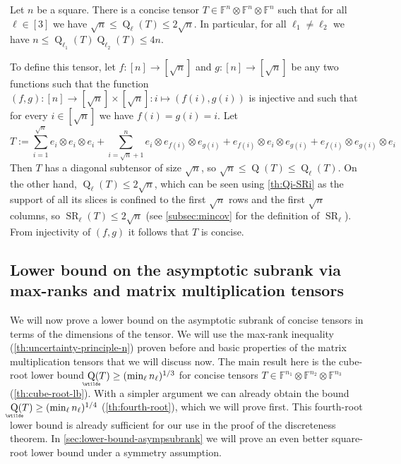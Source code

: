 \documentclass{daj}
\DeclareMathOperator{\subrank}{Q}
\DeclareMathOperator{\slicerank}{SR}
\DeclareMathOperator{\asympsubrank}{\underaccent{\wtilde}{Q}}
\newcommand{\FF}{\mathbb{F}}
\begin{document}
\begin{example}\label{ex:JopsEx}
    Let $n$ be a square.
    There is a concise tensor $T \in \FF^{n} \otimes \FF^n \otimes \FF^n$ such that for all~$\ell\in[3]$ we have
    $\sqrt{n} \leq \subrank_\ell(T)\leq 2\sqrt{n}$. In particular, for all ${\ell_1} \neq {\ell_2}$ we have $n\leq\subrank_{\ell_1}(T)\subrank_{\ell_2}(T)\leq4n$. 

    To define this tensor, let $f:[n]\to[\sqrt{n}]$ and $g:[n]\to[\sqrt{n}]$ be any two functions such that %
    the function $(f,g):[n]\to[\sqrt{n}]\times[\sqrt{n}] : i \mapsto (f(i), g(i))$ is injective and such that for every $i\in[\sqrt{n}]$ we have $f(i)=g(i)=i$. Let
    \[T:=\sum_{i=1}^{\sqrt{n}}e_i\otimes e_i\otimes e_i+\sum_{i=\sqrt{n}+1}^n e_i\otimes e_{f(i)}\otimes e_{g(i)} + e_{f(i)}\otimes e_i\otimes e_{g(i)} + e_{f(i)}\otimes e_{g(i)}\otimes e_i\]
    Then $T$ has a diagonal subtensor of size $\sqrt{n}$, so $\sqrt{n} \leq \subrank(T) \leq \subrank_\ell(T)$.
    On the other hand, $\subrank_\ell(T) \leq 2\sqrt{n}$, which can be seen using \autoref{th:Qi-SRi} %
    as the support of all its slices is confined to the first $\sqrt{n}$ rows and the first $\sqrt{n}$ columns, so $\slicerank_\ell(T)\leq 2\sqrt{n}$ (see \autoref{subsec:mincov} for the definition of $\slicerank_\ell$). From injectivity of $(f,g)$ it follows that $T$ is concise. %
\end{example}

\subsection{Lower bound on the asymptotic subrank via max-ranks and matrix multiplication tensors}\label{subsec:lb-mamu}

%

We will now prove a lower bound on the asymptotic subrank of concise tensors in terms of the dimensions of the tensor. We will use the max-rank inequality (\autoref{th:uncertainty-principle-n}) proven before and basic properties of the matrix multiplication tensors that we will discuss now. The main result here is the cube-root lower bound $\asympsubrank(T) \geq (\min_\ell n_\ell)^{1/3}$ for concise tensors $T \in \FF^{n_1} \otimes \FF^{n_2} \otimes \FF^{n_3}$ (\autoref{th:cube-root-lb}). With a simpler argument we can already obtain the bound $\asympsubrank(T) \geq (\min_\ell n_\ell)^{1/4}$ (\autoref{th:fourth-root}), which we will prove first. This fourth-root lower bound is already sufficient for our use in the proof of the discreteness theorem. In \autoref{sec:lower-bound-asympsubrank} we will prove an even better square-root lower bound under a symmetry assumption.
\end{document}
